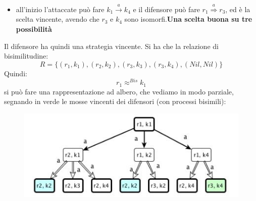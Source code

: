 \begin{esempio}
\begin{itemize}
{    possibilità }
    \item all'inizio l'attaccate può fare $k_1\stackrel{a}{\rightarrow}k_4$
    e il difensore può fare $r_1\stackrel{a}{\Rightarrow}r_3$, ed è la scelta
    vincente, avendo che $r_3$ e $k_4$ sono isomorfi.\textbf{Una scelta buona su tre
    possibilità }
  \end{itemize}
  Il difensore ha quindi una strategia vincente.
  Si ha che la relazione di bisimilitudine:
  \[R=\{(r_1, k_1),(r_2, k_2),(r_3, k_3),(r_3, k_4),(Nil, Nil)\}\]
  Quindi:
  \[r_1\approx^{Bis} k_1\]
  \newpage
  si può fare una rappresentazione ad albero, che vediamo in modo parziale,
  segnando in verde le mosse vincenti dei difensori (con processi bisimili):
    \begin{figure}[H]
    \centering
    \includegraphics[scale = 0.6]{img/alb1.jpg}
  \end{figure}
\end{esempio}
